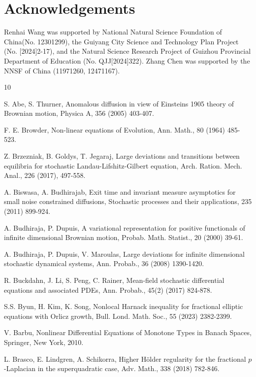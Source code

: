 \documentclass[11pt]{article}
\numberwithin{equation}{section}
\begin{document}
\section*{Acknowledgements}
Renhai Wang was supported by National Natural Science
Foundation of China(No. 12301299), the Guiyang City Science and Technology Plan Project (No. [2024]2-17), and the Natural Science Research Project of Guizhou Provincial Department of Education (No. QJJ[2024]322).  Zhang Chen was supported by the NNSF of China (11971260, 12471167).



\begin{thebibliography}{10}

\small
{}
 S. Abe, S. Thurner, Anomalous diffusion in view of Einsteins 1905 theory of Brownian motion, Physica A, 356 (2005)
403-407.


F. E. Browder, Non-linear equations of Evolution, Ann. Math.,  80 (1964) 485-523.


Z. Brzezniak, B. Goldys, T. Jegaraj, Large deviations and transitions between equilibria for
stochastic Landau-Lifshitz-Gilbert equation, Arch. Ration. Mech. Anal., 226 (2017), 497-558.

A. Biswasa, A. Budhirajab, Exit time and invariant measure asymptotics for small noise constrained diffusions, Stochastic processes and
their applications, 235 (2011) 899-924.

A. Budhiraja, P. Dupuis, A variational representation for positive functionals of infinite
dimensional Brownian motion, Probab. Math. Statist., 20 (2000) 39-61.

 A. Budhiraja, P. Dupuis, V. Maroulas, Large deviations for infinite
dimensional stochastic dynamical systems, Ann. Probab., 36 (2008) 1390-1420.

R. Buckdahn, J. Li, S. Peng, C. Rainer, Mean-field stochastic differential equations and
associated PDEs, Ann. Probab.,  45(2) (2017) 824-878.


S.S. Byun, H. Kim,  K. Song,  Nonlocal Harnack inequality for fractional elliptic equations with Orlicz growth,  Bull. Lond. Math. Soc.,
55 (2023) 2382-2399.


V. Barbu, Nonlinear Differential Equations of Monotone Types in Banach Spaces, Springer,
 New York, 2010.




L. Brasco, E. Lindgren, A. Schikorra, Higher H\"{o}lder regularity for the fractional $p$-Laplacian in the superquadratic case, Adv. Math.,  338  (2018) 782-846.


\end{thebibliography}
\end{document}
